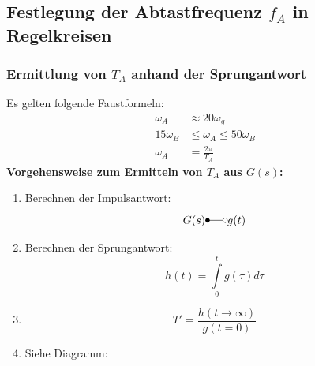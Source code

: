 \documentclass[a4paper,twocolumn,10pt]{article}
\begin{document}
\subsection{Festlegung der Abtastfrequenz $f_A$ in Regelkreisen}

\subsubsection{Ermittlung von $T_A$ anhand der Sprungantwort}
Es gelten folgende Faustformeln:
\begin{equation*}
\begin{split}
\omega_A&\approx 20\omega_g\\
15\omega_B&\leq\omega_A\leq 50\omega_B\\
\omega_A&=\frac{2\pi}{T_A}
\end{split}
\end{equation*}
\textbf{Vorgehensweise zum Ermitteln von $T_A$ aus $G(s)$:}
\begin{enumerate}
\item Berechnen der Impulsantwort:
\begin{equation*}
G(s)\Laplace g(t)
\end{equation*}
\item Berechnen der Sprungantwort:
\begin{equation*}
h(t)=\int\limits_0^tg(\tau)d\tau
\end{equation*}
\item
\begin{equation*}
T'=\frac{h(t\rightarrow\infty)}{g(t=0)}
\end{equation*}
\item Siehe Diagramm:
\end{enumerate}
\end{document}
